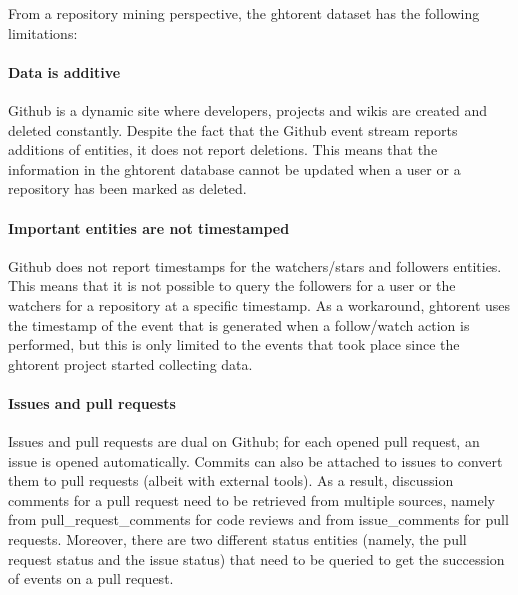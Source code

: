 \documentclass[conference,letter]{IEEEtran}
\begin{document}
From a repository mining perspective, the {\sc ght}orent dataset has the following
limitations: 

\paragraph*{Data is additive} Github is a dynamic site where developers, 
    projects and wikis are created and deleted constantly. Despite the fact
    that the Github event stream reports additions of entities, it does
    not report deletions. This means that the information in the {\sc ght}orent 
    database cannot be updated when a user or a repository has been marked
    as deleted.

\paragraph*{Important entities are not timestamped}
\label{chal:timestamp}
Github does not report
    timestamps for the watchers/stars and followers entities. This means that it
    is not possible to query the followers for a user or the watchers for a
    repository at a specific timestamp. As a workaround, {\sc ght}orent uses the
    timestamp of the event that is generated when a follow/watch action is
    performed, but this is only limited to the events that took place since
    the {\sc ght}orent project started collecting data.


\paragraph*{Issues and pull requests} Issues and pull requests are dual on
Github; for each opened pull request, an issue is opened automatically.  Commits
can also be attached to issues to convert them to pull requests (albeit with
external tools). As a result, discussion comments for a pull request need to be
retrieved from multiple sources, namely from {\sf pull\_request\_comments} for
code reviews and from {\sf issue\_comments} for pull requests. Moreover, there
are two different status entities (namely, the pull request status and the issue
status) that need to be queried to get the succession of events on a pull
request.
\end{document}
